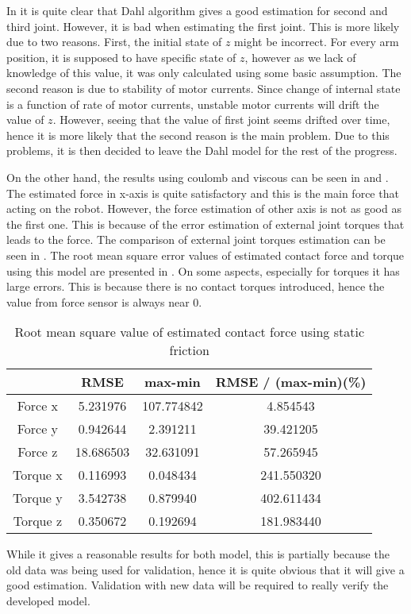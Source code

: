 In  it is quite clear that Dahl algorithm gives a good estimation for second and third joint. However, it is bad when estimating the first joint. This is more likely due to two reasons. First, the initial state of $z$ might be incorrect. For every arm position, it is supposed to have specific state of $z$, however as we lack of knowledge of this value, it was only calculated using some basic assumption. The second reason is due to stability of motor currents. Since change of internal state is a function of rate of motor currents, unstable motor currents will drift the value of $z$. However, seeing that the value of first joint seems drifted over time, hence it is more likely that the second reason is the main problem. Due to this problems, it is then decided to leave the Dahl model for the rest of the progress.

On the other hand, the results using coulomb and viscous can be seen in  and . The estimated force in x-axis is quite satisfactory and this is the main force that acting on the robot. However, the force estimation of other axis is not as good as the first one. This is because of the error estimation of external joint torques that leads to the force. The comparison of external joint torques estimation can be seen in . The root mean square error values of estimated contact force and torque using this model are presented in . On some aspects, especially for torques it has large errors. This is because there is no contact torques introduced, hence the value from force sensor is always near 0.

\begin{table}
    \centering
    \begin{tabular}{| c | c | c | c |}
    \hline
              & RMSE & max-min & RMSE / (max-min)(\%) \\ \hline
    Force x   & 5.231976  & 107.774842  & 4.854543  \\ \hline
    Force y   & 0.942644  & 2.391211    & 39.421205  \\ \hline
    Force z   & 18.686503 & 32.631091   & 57.265945  \\ \hline
    Torque x  & 0.116993  & 0.048434    & 241.550320  \\ \hline
    Torque y  & 3.542738  & 0.879940    & 402.611434  \\ \hline
    Torque z  & 0.350672  & 0.192694    & 181.983440  \\ \hline
    \end{tabular}
    \caption{Root mean square value of estimated contact force using static friction}
    \label{table:rmse}
\end{table}

While it gives a reasonable results for both model, this is partially because the old data was being used for validation, hence it is quite obvious that it will give a good estimation. Validation with new data will be required to really verify the developed model. 
